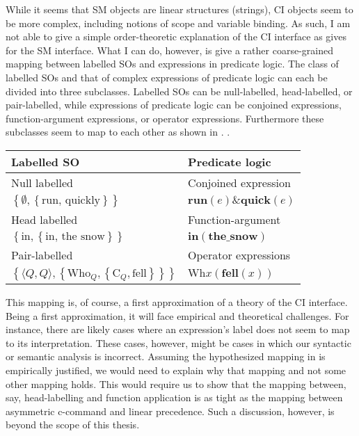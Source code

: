 \documentclass[MilwayThesis]{subfiles}
\begin{document}
While it seems that SM objects are linear structures (strings), CI objects seem to be more complex, including notions of scope and variable binding.
As such, I am not able to give a simple order-theoretic explanation of the CI interface as \textcite{kayne1994antisymmetry} gives for the SM interface.
What I can do, however, is give a rather coarse-grained mapping between labelled SOs and expressions in predicate logic.
The class of labelled SOs and that of complex expressions of predicate logic can each be divided into three subclasses.
Labelled SOs can be null-labelled, head-labelled, or pair-labelled, while expressions of predicate logic can be conjoined expressions, function-argument expressions, or operator expressions.
Furthermore these subclasses seem to map to each other as shown in \Next.
\ex.
\begin{tabular}[t]{ll}
	Labelled SO & Predicate logic\\
	\hline
	\hline
	Null labelled & Conjoined expression\\
	$\left\{ \emptyset, \left\{ \text{run, quickly} \right\} \right\}$ & $\textbf{run}(e) \& \textbf{quick}(e)$\\
	\hline
	Head labelled & Function-argument\\
	$\left\{ \text{in}, \left\{ \text{in, the snow} \right\} \right\}$ & $\textbf{in}(\textbf{the\_snow})$\\
	\hline
	Pair-labelled & Operator expressions\\
	$\left\{ \langle Q,Q\rangle, \left\{\text{Who}_Q, \left\{\text{C}_Q, \text{fell} \right\}  \right\} \right\}$ & $\text{Wh}x(\textbf{fell}(x))$\\
	\hline
\end{tabular}

This mapping is, of course, a first approximation of a theory of the CI interface.
Being a first approximation, it will face empirical and theoretical challenges.
For instance, there are likely cases where an expression's label does not seem to map to its interpretation.
These cases, however, might be cases in which our syntactic or semantic analysis is incorrect.
Assuming the hypothesized mapping in \Last is empirically justified, we would need to explain why that mapping and not some other mapping holds.
This would require us to show that the mapping between, say, head-labelling and function application is as tight as the mapping between asymmetric c-command and linear precedence.
Such a discussion, however, is beyond the scope of this thesis.
\end{document}

